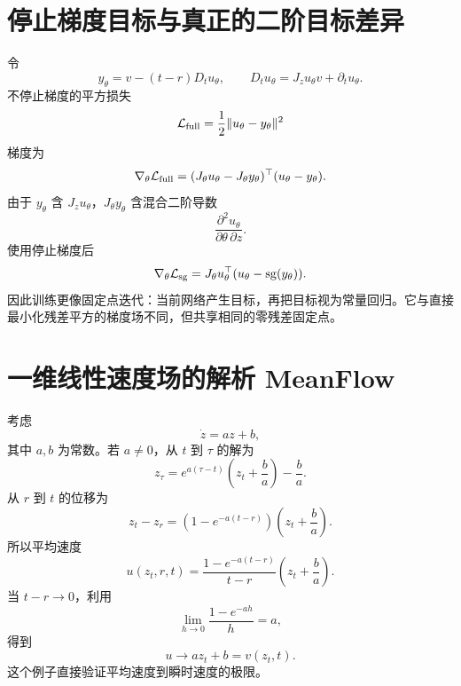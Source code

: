 \documentclass[UTF8,12pt,a4paper,fontset=none]{ctexart}
\numberwithin{equation}{section}
\newcommand{\Loss}{\mathcal{L}}
\newcommand{\sg}{\operatorname{sg}}
\begin{document}
\section{停止梯度目标与真正的二阶目标差异}
令
\begin{equation}
 y_\theta=v-(t-r)D_tu_\theta,
 \qquad
 D_tu_\theta=J_zu_\theta v+\partial_tu_\theta.
\end{equation}
不停止梯度的平方损失
\begin{equation}
 \Loss_{\rm full}=\frac12\|u_\theta-y_\theta\|^2
\end{equation}
梯度为
\begin{equation}
 \nabla_\theta\Loss_{\rm full}
 =(J_\theta u_\theta-J_\theta y_\theta)^\top(u_\theta-y_\theta).
\end{equation}
由于 $y_\theta$ 含 $J_zu_\theta$，$J_\theta y_\theta$ 含混合二阶导数
\begin{equation}
 \frac{\partial^2u_\theta}{\partial\theta\,\partial z}.
\end{equation}
使用停止梯度后
\begin{equation}
 \nabla_\theta\Loss_{\rm sg}
 =J_\theta u_\theta^\top(u_\theta-\sg(y_\theta)).
\end{equation}
因此训练更像固定点迭代：当前网络产生目标，再把目标视为常量回归。它与直接最小化残差平方的梯度场不同，但共享相同的零残差固定点。

\section{一维线性速度场的解析 MeanFlow}
考虑
\begin{equation}
 \dot z=az+b,
\end{equation}
其中 $a,b$ 为常数。若 $a\ne0$，从 $t$ 到 $\tau$ 的解为
\begin{equation}
 z_\tau=e^{a(\tau-t)}\left(z_t+\frac ba\right)-\frac ba.
\end{equation}
从 $r$ 到 $t$ 的位移为
\begin{equation}
 z_t-z_r
 =\left(1-e^{-a(t-r)}\right)\left(z_t+\frac ba\right).
\end{equation}
所以平均速度
\begin{equation}
 \boxed{u(z_t,r,t)=
 \frac{1-e^{-a(t-r)}}{t-r}
 \left(z_t+\frac ba\right).}
\end{equation}
当 $t-r\to0$，利用
\begin{equation}
 \lim_{h\to0}\frac{1-e^{-ah}}{h}=a,
\end{equation}
得到
\begin{equation}
 u\to az_t+b=v(z_t,t).
\end{equation}
这个例子直接验证平均速度到瞬时速度的极限。
\end{document}
